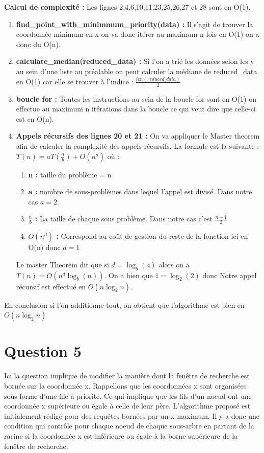 \documentclass{article}
\begin{document}
    \textbf{Calcul de complexité : }
    Les lignes 2,4,6,10,11,23,25,26,27 et 28 sont en O(1). \\
    \begin{enumerate}
        \item\textbf{find\_point\_with\_minimmum\_priority(data) : } Il s'agit de trouver la coordonnée minimum en x on va donc itérer au maximum
        n fois en O(1) on a donc du O(n).
        \item\textbf{calculate\_median(reduced\_data) : } Si l'on a trié les données selon les y au sein d'une liste au préalable on peut calculer la 
        médiane de reduced\_data en O(1) car elle se trouver à l'indice : $\frac{len(reduced\_data)}{2}$
        \item\textbf{boucle for : } Toutes les instructions au sein de la boucle for sont en O(1) on effectue au maximum n itérations dans la boucle
        ce qui veut dire que celle-ci est en O(n).
        \item\textbf{Appels récursifs des lignes 20 et 21 :} On va appliquer le Master theorem afin de calculer la complexité des appels récursifs.
        La formule est la suivante : $T(n) = aT(\frac{n}{b}) + O(n^d)$ où : 
            \begin{enumerate}
                \item \textbf{n : } taille du problème = n
                \item \textbf{a : } nombre de sous-problèmes dans lequel l'appel est divisé. Dans notre cas $a = 2$.
                \item \textbf{$\frac{n}{b}$ : } La taille de chaque sous problème. Dans notre cas c'est $\frac{n-1}{2}$
                \item \textbf{$O(n^d)$ : } Correspond au coût de gestion du reste de la fonction ici en O(n) donc $d=1$
            \end{enumerate}
        Le master Theorem dit que si $d = \log_b(a)$ alors on a $T(n) = O(n^d \log_b(n))$. On a bien que $1 = \log_2(2)$ donc
        Notre appel récursif est effectué en $O(n\log_2n)$.

    \end{enumerate}

    En conclusion si l'on additionne tout, on obtient que l'algorithme est bien en $O(n\log_2n)$

\newpage

\section{Question 5}
Ici la question implique de modifier la manière dont la fenêtre de recherche est bornée sur la coordonnée x. Rappellons que les coordonnées x sont organisées sous forme d'une file à priorité.
Ce qui implique que les fils d'un noeud ont une coordonnée x supérieure ou égale à celle de leur père. L'algorithme proposé est initialement rédigé pour des requêtes bornées par un x maximum. Il y a donc
une condition qui contrôle pour chaque noeud de chaque sous-arbre en partant de la racine si la coordonnée x est inférieure ou égale à la borne supérieure de la fenêtre de recherche. \\
\end{document}

